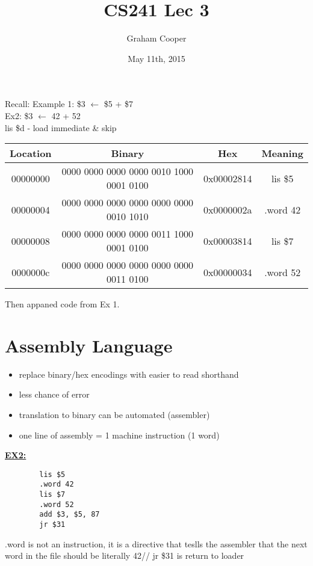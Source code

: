 \documentclass[12pt]{article}
\title{\vspace{-15ex}CS241 Lec 3\vspace{-1ex}}
\date{May 11th, 2015}
\author{Graham Cooper}
\newcommand{\myt}[1]{\textbf{\underline{#1}}}
\begin{document}
	\maketitle
	
	Recall: Example 1: \$3 $\leftarrow $ \$5 + \$7\\
	
	Ex2: \$3 $\leftarrow$ 42 + 52\\
	
	lis \$d - load immediate \& skip\\
	
	\begin{tabular}{c | c | c | c}
		Location & Binary & Hex & Meaning \\ \hline
		00000000 & 0000 0000 0000 0000 0010 1000 0001 0100 & 0x00002814 & lis \$5 \\
		00000004 & 0000 0000 0000 0000 0000 0000 0010 1010 & 0x0000002a & .word 42 \\
		00000008 & 0000 0000 0000 0000 0011 1000 0001 0100 & 0x00003814 & lis \$7 \\
		0000000c & 0000 0000 0000 0000 0000 0000 0011 0100 & 0x00000034 & .word 52 \\
	\end{tabular}
	Then appaned code from Ex 1.
	
	\section*{Assembly Language}
	\begin{itemize}
		\item replace binary/hex encodings with easier to read shorthand
		\item less chance of error
		\item translation to binary can be automated (assembler)
		\item one line of assembly = 1 machine instruction (1 word)
	\end{itemize}
	
	\myt{EX2:}\\
	\lstset{language=[mips]Assembler}
	\begin{lstlisting}
		lis $5
		.word 42
		lis $7
		.word 52
		add $3, $5, 87
		jr $31
	\end{lstlisting}
	.word is not an instruction, it is a directive that teslls the assembler that the next word in the file should be literally 42//
	jr \$31 is return to loader\\
	
\end{document}
